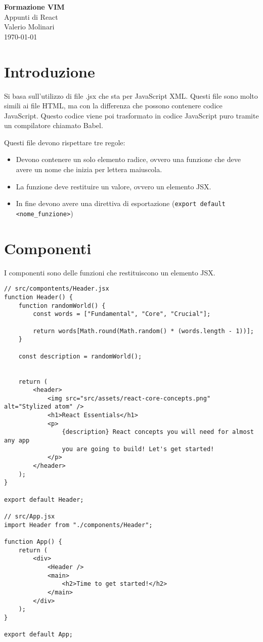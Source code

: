 \documentclass[12pt]{article}
\begin{document}
\begin{titlepage}
\begin{center}
\vspace*{3cm}
\Huge\textcolor{primary}{\textbf{Formazione VIM}} \\[1cm]
\Large\textcolor{secondary}{Appunti di React} \\[1cm]
\textcolor{accent}{Valerio Molinari}\\
\vfill
\today
\end{center}
\end{titlepage}

\tableofcontents
\newpage

\section{Introduzione}
Si basa sull'utilizzo di file .jsx che sta per JavaScript XML. 
Questi file sono molto simili ai file HTML, 
ma con la differenza che possono contenere codice JavaScript. 
Questo codice viene poi trasformato in codice JavaScript puro 
tramite un compilatore chiamato Babel.

Questi file devono rispettare tre regole:
\begin{itemize}
    \item Devono contenere un solo elemento radice, ovvero una funzione
    che deve avere un nome che inizia per lettera maiuscola.
    \item La funzione deve restituire un valore, ovvero un elemento JSX.
    \item In fine devono avere una direttiva di esportazione 
    ({\tt export default <nome\_funzione>})
\end{itemize}

\section{Componenti}
I componenti sono delle funzioni che restituiscono un elemento JSX.
\begin{verbatim}
// src/compontents/Header.jsx
function Header() {
    function randomWorld() {
        const words = ["Fundamental", "Core", "Crucial"];

        return words[Math.round(Math.random() * (words.length - 1))];
    }

    const description = randomWorld();

    
    return (
        <header>
            <img src="src/assets/react-core-concepts.png" alt="Stylized atom" />
            <h1>React Essentials</h1>
            <p>
                {description} React concepts you will need for almost any app
                you are going to build! Let's get started!
            </p>
        </header>
    );
}

export default Header;

// src/App.jsx
import Header from "./components/Header";

function App() {
    return (
        <div>
            <Header />
            <main>
                <h2>Time to get started!</h2>
            </main>
        </div>
    );
}

export default App;
\end{verbatim}
\end{document}
